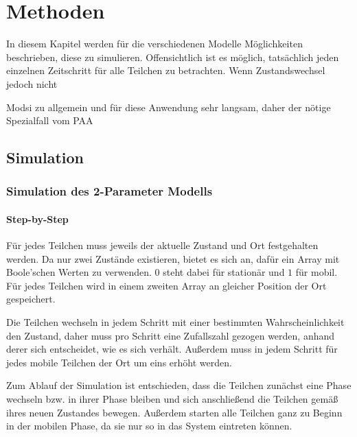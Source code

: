 \chapter{Methoden} 
\label{chapter:meth}

In diesem Kapitel werden für die verschiedenen Modelle Möglichkeiten beschrieben, diese zu simulieren. Offensichtlich ist es möglich, tatsächlich jeden einzelnen Zeitschritt für alle Teilchen zu betrachten. Wenn Zustandswechsel jedoch nicht  

Modsi zu allgemein und für diese Anwendung sehr langsam, daher der nötige Spezialfall vom PAA



\section{Simulation}

\subsection{Simulation des 2-Parameter Modells}
\subsubsection{Step-by-Step}
Für jedes Teilchen muss jeweils der aktuelle Zustand und Ort festgehalten werden. Da nur zwei Zustände existieren, bietet es sich an, dafür ein Array mit Boole'schen Werten zu verwenden. $0$ steht dabei für stationär und $1$ für mobil. Für jedes Teilchen wird in einem zweiten Array an gleicher Position der Ort gespeichert.

Die Teilchen wechseln in jedem Schritt mit einer bestimmten Wahrscheinlichkeit den Zustand, daher muss pro Schritt eine Zufallszahl gezogen werden, anhand derer sich entscheidet, wie es sich verhält. Außerdem muss in jedem Schritt für jedes mobile Teilchen der Ort um eins erhöht werden.

Zum Ablauf der Simulation ist entschieden, dass die Teilchen zunächst eine Phase wechseln bzw. in ihrer Phase bleiben und sich anschließend die Teilchen gemäß ihres neuen Zustandes bewegen. Außerdem starten alle Teilchen ganz zu Beginn in der mobilen Phase, da sie nur so in das System eintreten können.

